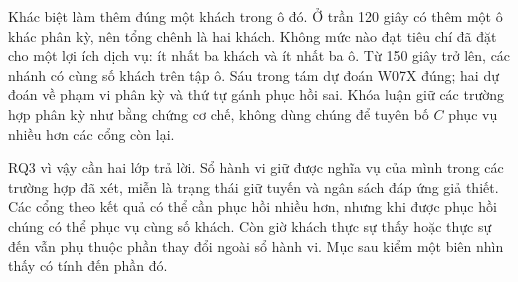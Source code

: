 Khác biệt làm thêm đúng một khách trong ô đó. Ở trần 120 giây có thêm một ô
khác phân kỳ, nên tổng chênh là hai khách. Không mức nào đạt tiêu chí đã đặt
cho một lợi ích dịch vụ: ít nhất ba khách và ít nhất ba ô. Từ 150 giây trở lên,
các nhánh có cùng số khách trên tập ô. Sáu trong tám dự đoán W07X đúng; hai
dự đoán về phạm vi phân kỳ và thứ tự gánh phục hồi sai. Khóa luận giữ các
trường hợp phân kỳ như bằng chứng cơ chế, không dùng chúng để tuyên bố $C$
phục vụ nhiều hơn các cổng còn lại.

RQ3 vì vậy cần hai lớp trả lời. Sổ hành vi giữ được nghĩa vụ của mình trong
các trường hợp đã xét, miễn là trạng thái giữ tuyến và ngân sách đáp ứng giả
thiết. Các cổng theo kết quả có thể cần phục hồi nhiều hơn, nhưng khi được
phục hồi chúng có thể phục vụ cùng số khách. Còn giờ khách thực sự thấy hoặc
thực sự đến vẫn phụ thuộc phần thay đổi ngoài sổ hành vi. Mục sau kiểm một
biên nhìn thấy có tính đến phần đó.
